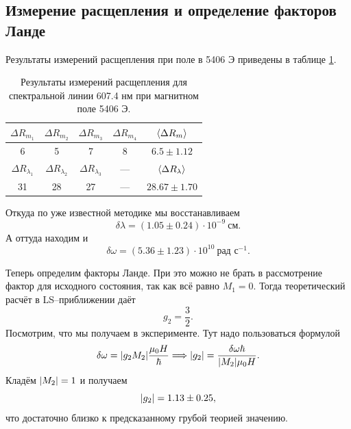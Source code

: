 \documentclass[12pt]{article}
\begin{document}
	 \subsection{Измерение расщепления и определение факторов Ланде}
	 Результаты измерений расщепления при поле в 5406 Э приведены в таблице \ref{table:6}.
	 \begin{table}[h!]
		\centering
		\begin{tabular}{|c c c c | c |} 
 			\hline
 			$\Delta R_{m_1}$ & $\Delta R_{m_2}$ & $\Delta R_{m_3}$ & $\Delta R_{m_4}$ & $\expval{\Delta R_m}$ \\
 			\hline
 			6 & 5 & 7 & 8 & $6.5\pm1.12$ \\
 			\hline\hline
 			$\Delta R_{\lambda_1}$ & $\Delta R_{\lambda_2}$ & $\Delta R_{\lambda_3}$ & \---- & $\expval{\Delta R_\lambda}$ \\
 			\hline
 			31& 28& 27& \---- & $28.67\pm1.70$\\
 			\hline
		\end{tabular}
		\caption{Результаты измерений расщепления для спектральной линии 607.4 нм при магнитном поле 5406 Э.}
		\label{table:6}
	\end{table}
	Откуда по уже известной методике мы восстанавливаем 
	\begin{equation}
		\delta \lambda = (1.05\pm0.24)\cdot 10^{-9}\ \text{см}.
	\end{equation}
	А оттуда находим и 
	\begin{equation}
		\delta \omega = (5.36 \pm 1.23)\cdot10^{10}\ \text{рад с}{}^{-1}.
	\end{equation}
	\par Теперь определим факторы Ланде. При это можно не брать в рассмотрение фактор для исходного состояния, так как всё равно $M_1 = 0$. Тогда теоретический расчёт в LS\---приближении даёт
	\begin{equation}
		g_2 = \dfrac{3}{2}.
	\end{equation}
	Посмотрим, что мы получаем в эксперименте. Тут надо пользоваться формулой
	\begin{equation}
		\delta\omega = \abs{g_2 M_2} \dfrac{\mu_0H}{\hbar}\Longrightarrow \abs{g_2} = \dfrac{\delta\omega\hbar}{\abs{M_2}\mu_0H}.
	\end{equation}
	Кладём $\abs{M_2} = 1$ и получаем %
	\begin{equation}
		\abs{g_2} = 1.13\pm0.25,
	\end{equation}
	что достаточно близко к предсказанному грубой теорией значению.
\end{document}
